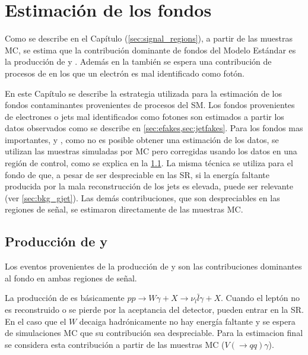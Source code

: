 \chapter{Estimación de los fondos} \label{cap:fondos}

Como se describe en el Capítulo (\cref{sec:signal_regions}), a partir de las
muestras MC, se estima que la contribución dominante de fondos del Modelo
Estándar es la producción de {\wgam} y {\ttgam}. Además en la {\SRL} también se
espera una contribución de procesos de {\ttbar} en los que un electrón es mal
identificado como fotón.

En este Capítulo se describe la estrategia utilizada para la estimación de los
fondos contaminantes provenientes de procesos del SM.
Los fondos provenientes de electrones o jets mal identificados como fotones son
estimados a partir los datos observados como se describe en
\cref{sec:efakes,sec:jetfakes}. Para los fondos mas importantes, {\wgam} y
{\ttgam}, como no es posible obtener una estimación de los datos, se
utilizan las muestras simuladas por MC pero corregidas usando los datos en
una región de control, como se explica en la \cref{sec:bkg_wgam_ttgam}. La
misma técnica se utiliza para el fondo de {\gjet} que, a pesar de ser
despreciable en las SR, si la energía faltante producida por la mala
reconstrucción de los jets es elevada, puede ser relevante (ver
\cref{sec:bkg_gjet}). Las demás contribuciones, que son despreciables en
las regiones de señal, se estimaron directamente de las muestras MC.



\section[Producción de {\wgam} y $tt\gamma$]{Producción de {\wgam} y {\ttgam}}
\label{sec:bkg_wgam_ttgam}

Los eventos provenientes de la producción de {\wgam} y {\ttgam} son las
contribuciones dominantes al fondo en ambas regiones de señal.

La producción de {\wgam} es básicamente $pp \to W\gamma + X \to \nu_l
\bar{l}\gamma + X$. Cuando el leptón no es reconstruido o se pierde por la
aceptancia del detector, pueden entrar en la SR. En el caso que el $W$
decaiga hadrónicamente no hay energía faltante y se espera de simulaciones MC que
su contribución sea despreciable. Para la estimacion final se considera
esta contribución a partir de las muestras MC ($V(\to qq)\gamma$).

